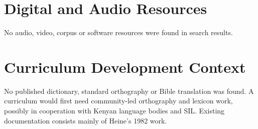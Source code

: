 \documentclass[12pt]{article}
\begin{document}
\section{Digital and Audio Resources}
No audio, video, corpus or software resources were found in search results.

\section{Curriculum Development Context}
No published dictionary, standard orthography or Bible translation was found. A curriculum would first need community-led orthography and lexicon work, possibly in cooperation with Kenyan language bodies and SIL. Existing documentation consists mainly of Heine's 1982 work.
\end{document}
